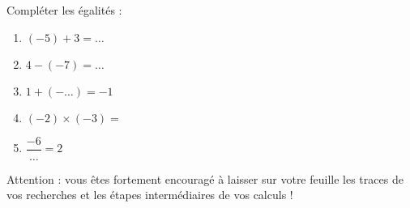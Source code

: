 
\begin{exercice}\label{exosmath-0778}

    Compléter les égalités :
    \begin{multicols}{2}
        \begin{enumerate}
            \item
                \( (-5)+3=\ldots\)
            \item
                \( 4-(-7)=\ldots\)
            \item
                \( 1+(-\ldots)=-1\)
            \item
                \( (-2)\times (-3)=\)
            \item
                \( \dfrac{ -6 }{ \ldots }=2\)
        \end{enumerate}
    \end{multicols}
    Attention : vous êtes fortement encouragé à laisser sur votre feuille les traces de vos recherches et les étapes intermédiaires de vos calculs !

\end{exercice}
